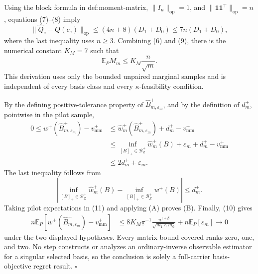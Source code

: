 Using the block formula in def:moment-matrix, \(\lVert I_n\rVert_{\mathrm{op}}=1\), and \(\lVert\mathbf 1\mathbf 1^{\top}\rVert_{\mathrm{op}}=n\), equations (7)--(8) imply
\[
\lVert\widehat Q_e-Q(c_e)\rVert_{\mathrm{op}}
\le (4n+8)(D_1+D_0)
\le 7n(D_1+D_0),
\tag{9}
\]
where the last inequality uses \(n\ge3\).  Combining (6) and (9), there is the numerical constant \(K_M=7\) such that
\[
\mathbb E_P M_m\le K_M\frac{n}{\sqrt m}.
\tag{10}
\]
This derivation uses only the bounded unpaired marginal samples and is independent of every basis class and every \(\kappa\)-feasibility condition.

By the defining positive-tolerance property of \(\widehat B_{m,\varepsilon_m}^+\), and by the definition of \(d_m^+\), pointwise in the pilot sample,
\[
\begin{aligned}
0\le w^+(\widehat B_{m,\varepsilon_m}^+)-v_{\mathrm{mm}}^+
&\le \widehat w_m^+(\widehat B_{m,\varepsilon_m}^+)
   +d_m^+-v_{\mathrm{mm}}^+\\
&\le \inf_{[B]_+\in\mathcal B_Z^+}\widehat w_m^+(B)
   +\varepsilon_m+d_m^+-v_{\mathrm{mm}}^+\\
&\le 2d_m^++\varepsilon_m.
\end{aligned}
\tag{11}
\]
The last inequality follows from
\[
\left|
\inf_{[B]_+\in\mathcal B_Z^+}\widehat w_m^+(B)
-\inf_{[B]_+\in\mathcal B_Z^+}w^+(B)
\right|\le d_m^+.
\]
Taking pilot expectations in (11) and applying (A) proves (B).  Finally, (10) gives
\[
\begin{aligned}
n\mathbb E_P\!\left[
w^+(\widehat B_{m,\varepsilon_m}^+)-v_{\mathrm{mm}}^+
\right]
&\le
8K_M\underline\pi^{-1}
\frac{n^{1+\beta}}{\sqrt{m_1\wedge m_0}}
+n\mathbb E_P[\varepsilon_m]
\longrightarrow0
\end{aligned}
\]
under the two displayed hypotheses.  Every matrix bound covered ranks zero, one, and two.  No step constructs or analyzes an ordinary-inverse observable estimator for a singular selected basis, so the conclusion is solely a full-carrier basis-objective regret result. \(\square\)